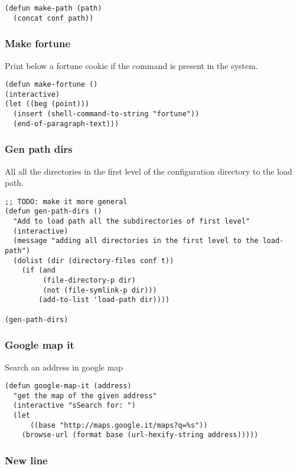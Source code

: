 \documentclass[11pt]{article}
\begin{document}
\begin{verbatim}
(defun make-path (path)
  (concat conf path))
\end{verbatim}
\subsubsection{Make fortune}
\label{sec-18.2.2}

    Print below a fortune cookie if the command is present in the system.

\begin{verbatim}
(defun make-fortune ()
(interactive)
(let ((beg (point)))
  (insert (shell-command-to-string "fortune"))
  (end-of-paragraph-text)))
\end{verbatim}

 
\subsubsection{Gen path dirs}
\label{sec-18.2.3}

   All all the directories in the first level of the configuration directory to the load path.

\begin{verbatim}
;; TODO: make it more general
(defun gen-path-dirs ()
  "Add to load path all the subdirectories of first level"
  (interactive)
  (message "adding all directories in the first level to the load-path")
  (dolist (dir (directory-files conf t))
    (if (and 
         (file-directory-p dir)
         (not (file-symlink-p dir)))
        (add-to-list 'load-path dir))))

(gen-path-dirs)
\end{verbatim}
\subsubsection{Google map it}
\label{sec-18.2.4}

   Search an address in google map
\begin{verbatim}
(defun google-map-it (address)
  "get the map of the given address"
  (interactive "sSearch for: ")
  (let
      ((base "http://maps.google.it/maps?q=%s"))
    (browse-url (format base (url-hexify-string address)))))
\end{verbatim}
\subsubsection{New line}
\label{sec-18.2.5}
\end{document}
